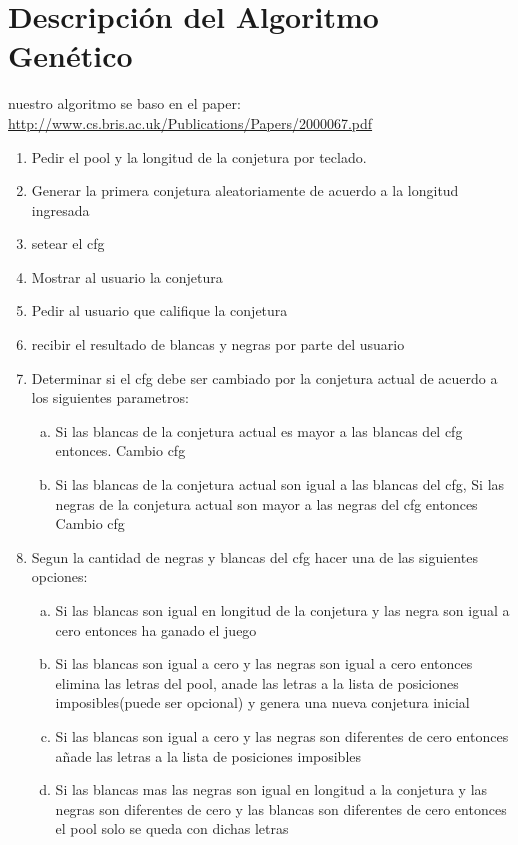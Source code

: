 \section{ Descripción del Algoritmo Genético}
nuestro algoritmo se baso en el paper:
 \url {http://www.cs.bris.ac.uk/Publications/Papers/2000067.pdf}
\begin{enumerate}[1)]
 \item Pedir el pool y la longitud de la conjetura por teclado.
 \item Generar la primera conjetura aleatoriamente de acuerdo a la longitud ingresada
 \item setear el cfg
 \item  Mostrar al usuario la conjetura
  \item  Pedir al usuario que califique la conjetura
 \item recibir el resultado de blancas y negras por parte del usuario  
 \item Determinar si el cfg debe ser cambiado por la conjetura actual de acuerdo a los siguientes parametros:
         \begin{enumerate}[a)]
         \item Si las blancas de la conjetura actual es mayor a las  blancas del cfg entonces. Cambio cfg
         \item Si las blancas de la conjetura actual son igual a las  blancas del cfg, Si las negras de la conjetura actual son mayor a las  negras del cfg entonces Cambio cfg
    \end{enumerate}
 \item Segun la cantidad de negras y blancas del cfg hacer una de las siguientes opciones:
          \begin{enumerate}[a)]
         \item Si las blancas son igual en longitud de la conjetura y las negra son igual a cero entonces ha ganado el juego
         \item Si las blancas son igual a cero y las negras son igual a cero entonces elimina las letras del pool, anade las letras a la lista de posiciones imposibles(puede ser opcional) y genera una nueva conjetura inicial
         \item Si las blancas son igual a cero y las negras son diferentes de cero entonces añade las letras a la lista de posiciones imposibles
         \item Si las blancas mas las negras son igual en longitud a la conjetura y las negras son diferentes de cero y las blancas son diferentes de cero entonces el pool solo se queda con dichas letras

\end{enumerate}
\end{enumerate}
